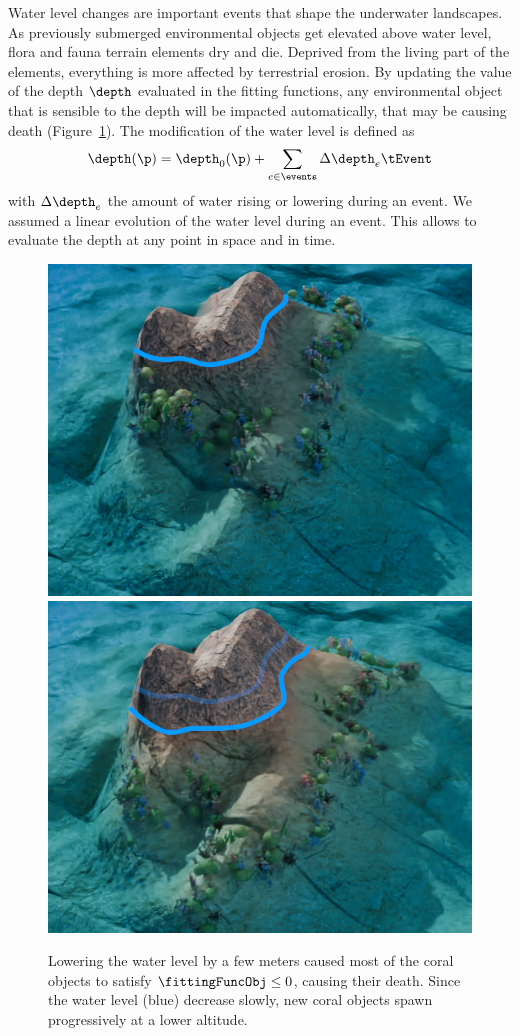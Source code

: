 Water level changes are important events that shape the underwater landscapes. As previously submerged environmental objects get elevated above water level, flora and fauna terrain elements dry and die. Deprived from the living part of the elements, everything is more affected by terrestrial erosion. By updating the value of the depth $\depth$ evaluated in the fitting functions, any environmental object that is sensible to the depth will be impacted automatically, that may be causing death (Figure~\ref{EnvironmentalObjects-fig:water-event}). The modification of the water level is defined as 
\begin{align*}
    \depth(\p) = \depth_0(\p) + \sum_{e \in \events} \Delta \depth_e \tEvent
\end{align*}
with $\Delta \depth_e$ the amount of water rising or lowering during an event. We assumed a linear evolution of the water level during an event. This allows to evaluate the depth at any point in space and in time.

\begin{figure}
    \centering
    \includegraphics[width = 0.45 \linewidth]{Figures/Interactions/InteractionWater1.png}
    \includegraphics[width = 0.45 \linewidth]{Figures/Interactions/InteractionWater3.png}
    \caption{Lowering the water level by a few meters caused most of the coral objects to satisfy $\fittingFuncObj \leq 0$, causing their death. Since the water level (blue) decrease slowly, new coral objects spawn progressively at a lower altitude.}
    \label{EnvironmentalObjects-fig:water-event}
\end{figure}

